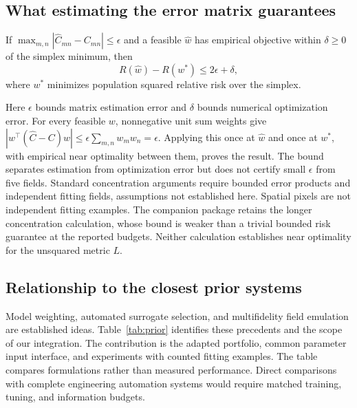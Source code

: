 \subsection{What estimating the error matrix guarantees}
\label{app:proof}
\begin{proposition}
\label{prop:bound}
If $\max_{m,n}|\widehat C_{mn}-C_{mn}|\leq\epsilon$ and a feasible
$\widehat w$ has empirical objective within $\delta\geq0$ of the simplex
minimum, then
\begin{equation}
 R(\widehat w)-R(w^*)\leq2\epsilon+\delta,
 \label{eq:bound}
\end{equation}
where $w^*$ minimizes population squared relative risk over the simplex.
\end{proposition}
Here $\epsilon$ bounds matrix estimation error and $\delta$ bounds numerical
optimization error. For every feasible $w$, nonnegative unit sum weights give
$|w^\top(\widehat C-C)w|\leq\epsilon\sum_{m,n}w_mw_n=\epsilon$.
Applying this once at $\widehat w$ and once at $w^*$, with empirical near
optimality between them, proves the result. The bound separates estimation
from optimization error but does not certify small $\epsilon$ from five
fields. Standard concentration arguments \citep{hoeffding1963} require
bounded error products and independent fitting fields, assumptions not
established here. Spatial pixels are not independent fitting examples.
The companion package retains the longer concentration calculation, whose
bound is weaker than a trivial bounded risk guarantee at the reported budgets.
Neither calculation establishes near optimality for the unsquared metric $L$.

\clearpage
\subsection{Relationship to the closest prior systems}
\label{app:prior}
Model weighting, automated surrogate selection, and multifidelity field
emulation are established ideas. Table~\ref{tab:prior} identifies these
precedents and the scope of our integration. The contribution is the adapted
portfolio, common parameter input interface, and experiments with counted
fitting examples. The table compares formulations rather than measured
performance. Direct comparisons with complete engineering automation systems
would require matched training, tuning, and information budgets.

